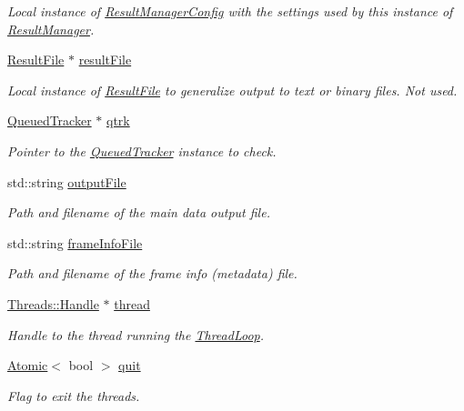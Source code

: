 \begin{DoxyCompactItemize}
\begin{DoxyCompactList}\small\item\em Local instance of \hyperlink{struct_result_manager_config}{Result\+Manager\+Config} with the settings used by this instance of \hyperlink{class_result_manager}{Result\+Manager}. \end{DoxyCompactList}\item 
\hyperlink{class_result_file}{Result\+File} $\ast$ \hyperlink{class_result_manager_a886e75626ba90bb4aff4dcf661733b30}{result\+File}
\begin{DoxyCompactList}\small\item\em Local instance of \hyperlink{class_result_file}{Result\+File} to generalize output to text or binary files. Not used. \end{DoxyCompactList}\item 
\hyperlink{class_queued_tracker}{Queued\+Tracker} $\ast$ \hyperlink{class_result_manager_a782d776e818e9be737c418d2151402ed}{qtrk}
\begin{DoxyCompactList}\small\item\em Pointer to the \hyperlink{class_queued_tracker}{Queued\+Tracker} instance to check. \end{DoxyCompactList}\item 
std\+::string \hyperlink{class_result_manager_aa882de00c45911638edda0705fb54f36}{output\+File}
\begin{DoxyCompactList}\small\item\em Path and filename of the main data output file. \end{DoxyCompactList}\item 
std\+::string \hyperlink{class_result_manager_a204b1725be212dbad21eea374420270f}{frame\+Info\+File}
\begin{DoxyCompactList}\small\item\em Path and filename of the frame info (metadata) file. \end{DoxyCompactList}\item 
\hyperlink{struct_threads_1_1_handle}{Threads\+::\+Handle} $\ast$ \hyperlink{class_result_manager_ab3ef361e61d16ef54726cd7b78f03cd5}{thread}
\begin{DoxyCompactList}\small\item\em Handle to the thread running the \hyperlink{class_result_manager_a0aff477d777703dd9f1e01ba0bd6f2d8}{Thread\+Loop}. \end{DoxyCompactList}\item 
\hyperlink{class_atomic}{Atomic}$<$ bool $>$ \hyperlink{class_result_manager_a2e8af4e9f24aff29025adb24032d788e}{quit}
\begin{DoxyCompactList}\small\item\em Flag to exit the threads. \end{DoxyCompactList}\end{DoxyCompactItemize}


